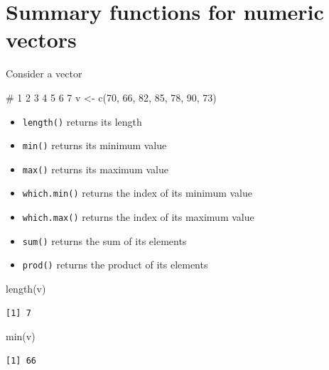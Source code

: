 \documentclass[
  letterpaper,
  DIV=11,
  numbers=noendperiod]{scrreprt}
\newenvironment{Shaded}{\begin{snugshade}}{\end{snugshade}}
\newcommand{\CommentTok}[1]{\textcolor[rgb]{0.37,0.37,0.37}{#1}}
\newcommand{\DecValTok}[1]{\textcolor[rgb]{0.68,0.00,0.00}{#1}}
\newcommand{\FunctionTok}[1]{\textcolor[rgb]{0.28,0.35,0.67}{#1}}
\newcommand{\NormalTok}[1]{\textcolor[rgb]{0.00,0.23,0.31}{#1}}
\newcommand{\OtherTok}[1]{\textcolor[rgb]{0.00,0.23,0.31}{#1}}
\begin{document}
\section{Summary functions for numeric
vectors}\label{summary-functions-for-numeric-vectors}

Consider a vector

\begin{Shaded}
\begin{Highlighting}[]
\CommentTok{\#       1   2   3   4   5   6   7}
\NormalTok{v }\OtherTok{\textless{}{-}} \FunctionTok{c}\NormalTok{(}\DecValTok{70}\NormalTok{, }\DecValTok{66}\NormalTok{, }\DecValTok{82}\NormalTok{, }\DecValTok{85}\NormalTok{, }\DecValTok{78}\NormalTok{, }\DecValTok{90}\NormalTok{, }\DecValTok{73}\NormalTok{)}
\end{Highlighting}
\end{Shaded}

\begin{itemize}
\item
  \texttt{length()} returns its length
\item
  \texttt{min()} returns its minimum value
\item
  \texttt{max()} returns its maximum value
\item
  \texttt{which.min()} returns the index of its minimum value
\item
  \texttt{which.max()} returns the index of its maximum value
\item
  \texttt{sum()} returns the sum of its elements
\item
  \texttt{prod()} returns the product of its elements
\end{itemize}

\begin{Shaded}
\begin{Highlighting}[]
\FunctionTok{length}\NormalTok{(v)}
\end{Highlighting}
\end{Shaded}

\begin{verbatim}
[1] 7
\end{verbatim}

\begin{Shaded}
\begin{Highlighting}[]
\FunctionTok{min}\NormalTok{(v)}
\end{Highlighting}
\end{Shaded}

\begin{verbatim}
[1] 66
\end{verbatim}
\end{document}
